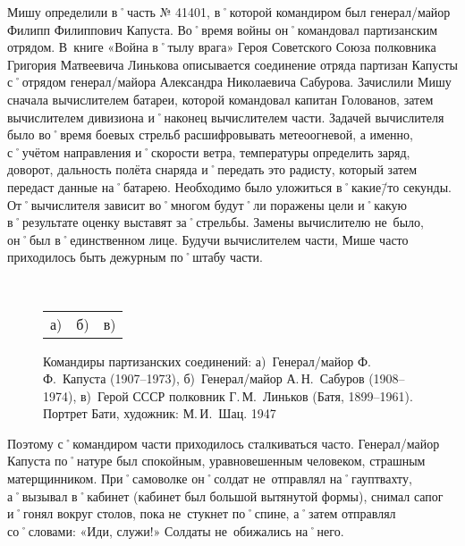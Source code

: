 Мишу определили в˚часть № 41401, в˚которой командиром был генерал\-/майор Филипп Филиппович Капуста. Во˚время войны он˚командовал партизанским отрядом. В~книге «Война в˚тылу врага» Героя Советского Союза полковника Григория Матвеевича Линькова описывается соединение отряда партизан Капусты с˚отрядом генерал\-/майора Александра Николаевича Сабурова. Зачислили Мишу сначала вычислителем батареи, которой командовал капитан Голованов, затем вычислителем дивизиона и˚наконец вычислителем части. Задачей вычислителя было во˚время боевых стрельб расшифровывать метеоогневой, а именно, с˚учётом направления и˚скорости ветра, температуры определить заряд, доворот, дальность полёта снаряда и˚передать это радисту, который затем передаст данные на˚батарею. Необходимо было уложиться в˚какие\=/то секунды. От˚вычислителя зависит во˚многом будут˚ли поражены цели и˚какую в˚результате оценку выставят за˚стрельбы. Замены вычислителю не~было, он˚был в˚единственном лице. Будучи вычислителем части, Мише часто приходилось быть дежурным по˚штабу части. 

\begin{figure}[h]
	\hfil	
	\begin{minipage}[b]{0.32\linewidth}			
	\end{minipage}	
	\hfil	
	\begin{minipage}[b]{0.32\linewidth}	
	\end{minipage}	
	\hfil	
	\begin{minipage}[b]{0.32\linewidth}		
	\end{minipage}	
	\hfil
	\\[1ex]	
	\begin{minipage}[b]{.96\linewidth}
		\begin{tabular}{p{.32\linewidth}p{.32\linewidth}p{.32\linewidth}}
			\centering а) & \centering б) & \centering в) 
		\end{tabular}
	\end{minipage}	
	\captionsetup{skip=1ex}							%
	\caption{Командиры партизанских соединений: 
	а)~Генерал\-/майор Ф.\,Ф.~Капуста (1907–1973), 
	б)~Генерал\-/майор А.\,Н.~Сабуров (1908–1974), 
	в)~Герой СССР полковник Г.\,М.~Линьков (Батя, 1899–1961). Портрет Бати, художник: М.\,И.~Шац. 1947}
\end{figure}

Поэтому с˚командиром части приходилось сталкиваться часто. Генерал\-/майор Капуста по˚натуре был спокойным, уравновешенным человеком, страшным матерщинником. При˚самоволке он˚солдат не~отправлял на˚гауптвахту, а˚вызывал в˚кабинет (кабинет был большой вытянутой формы), снимал сапог и˚гонял вокруг столов, пока не~стукнет по˚спине, а˚затем отправлял со˚словами: «Иди, служи!» Солдаты не~обижались на˚него.

